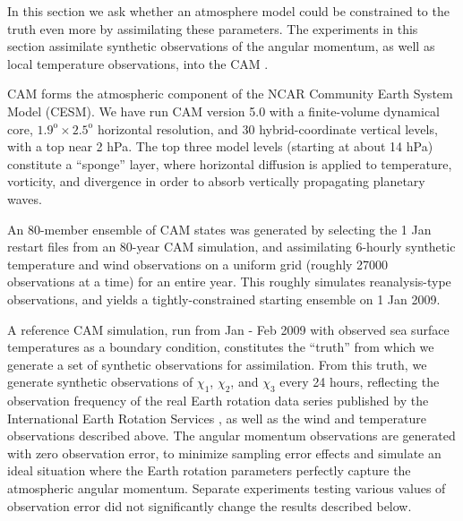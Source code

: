 In this section we ask whether an atmosphere model could be constrained to the truth even more by assimilating these parameters. 
The experiments in this section assimilate synthetic observations of the angular momentum, as well as local temperature observations, into the CAM \citep{nealeetal2010}.

CAM forms the atmospheric component of the NCAR Community Earth System Model (CESM). 
We have run CAM version 5.0 with a finite-volume dynamical core, $1.9^{\text{o}} \times 2.5^{\text{o}}$ horizontal resolution, and  30 hybrid-coordinate vertical levels, with a top near 2 hPa.
The top three model levels (starting at about 14 hPa) constitute a ``sponge'' layer, where horizontal diffusion is applied to temperature, vorticity, and divergence in order to absorb vertically propagating planetary waves.  


An 80-member ensemble of CAM states was generated by selecting the 1 Jan restart files from an 80-year CAM simulation, and assimilating 6-hourly synthetic temperature and wind observations on a uniform grid (roughly 27000 observations at a time) for an entire year. 
This roughly simulates reanalysis-type observations, and yields a tightly-constrained starting ensemble on 1 Jan 2009.  

A reference CAM simulation, run from Jan - Feb 2009 with observed sea surface temperatures as a boundary condition, constitutes the ``truth'' from which we generate a set of synthetic observations for assimilation. 
From this truth, we generate synthetic observations of $\chi_1$, $\chi_2$, and $\chi_3$ every 24 hours, reflecting the observation frequency of the real Earth rotation data series published by the International Earth Rotation Services \citep{iers}, as well as the wind and temperature observations described above. 
The angular momentum observations are generated with zero observation error, to minimize sampling error effects and simulate an ideal situation where the Earth rotation parameters perfectly capture the atmospheric angular momentum. 
Separate experiments testing various values of observation error did not significantly change the results described below.  

